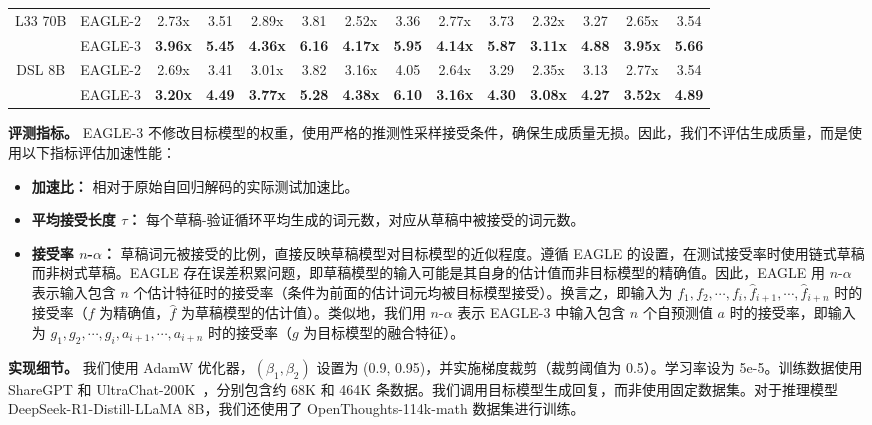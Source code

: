 \documentclass[11pt]{article}
\begin{document}
\begin{table}[h]
{\begin{tabular}{cccccccccccccc}
    \midrule
    \multirow{2}[2]{*}{L33 70B} & EAGLE-2 & 2.73x & 3.51  & 2.89x & 3.81  & 2.52x & 3.36  & 2.77x & 3.73  & 2.32x & 3.27  & 2.65x & 3.54 \\
          & EAGLE-3 & \textbf{3.96x} & \textbf{5.45} & \textbf{4.36x} & \textbf{6.16} & \textbf{4.17x} & \textbf{5.95} & \textbf{4.14x} & \textbf{5.87} & \textbf{3.11x} & \textbf{4.88} & \textbf{3.95x} & \textbf{5.66} \\
    \midrule
    \multirow{2}[2]{*}{DSL 8B} & EAGLE-2 & 2.69x & 3.41  & 3.01x & 3.82  & 3.16x & 4.05  & 2.64x & 3.29  & 2.35x & 3.13  & 2.77x & 3.54 \\
          & EAGLE-3 & \textbf{3.20x} & \textbf{4.49} & \textbf{3.77x} & \textbf{5.28} & \textbf{4.38x} & \textbf{6.10} & \textbf{3.16x} & \textbf{4.30} & \textbf{3.08x} & \textbf{4.27} & \textbf{3.52x} & \textbf{4.89} \\
    \bottomrule
    \end{tabular}%
    }
  \label{tab:experiments}%
\end{table}%

\textbf{评测指标。} EAGLE-3 不修改目标模型的权重，使用严格的推测性采样接受条件，确保生成质量无损。因此，我们不评估生成质量，而是使用以下指标评估加速性能：

\begin{itemize}
    \item \textbf{加速比：} 相对于原始自回归解码的实际测试加速比。
    \item \textbf{平均接受长度 $\tau$：} 每个草稿-验证循环平均生成的词元数，对应从草稿中被接受的词元数。
    \item \textbf{接受率 $n$-$\alpha$：} 草稿词元被接受的比例，直接反映草稿模型对目标模型的近似程度。遵循 EAGLE 的设置，在测试接受率时使用链式草稿而非树式草稿。EAGLE 存在误差积累问题，即草稿模型的输入可能是其自身的估计值而非目标模型的精确值。因此，EAGLE 用 $n$-$\alpha$ 表示输入包含 $n$ 个估计特征时的接受率（条件为前面的估计词元均被目标模型接受）。换言之，即输入为 $f_1,f_2,\cdots,f_i,\hat{f}_{i+1},\cdots,\hat{f}_{i+n}$ 时的接受率（$f$ 为精确值，$\hat{f}$ 为草稿模型的估计值）。类似地，我们用 $n$-$\alpha$ 表示 EAGLE-3 中输入包含 $n$ 个自预测值 $a$ 时的接受率，即输入为 $g_1,g_2,\cdots,g_i,{a}_{i+1},\cdots,{a}_{i+n}$ 时的接受率（$g$ 为目标模型的融合特征）。
\end{itemize}

\textbf{实现细节。} 我们使用 AdamW 优化器，$(\beta_1,\beta_2)$ 设置为 (0.9, 0.95)，并实施梯度裁剪（裁剪阈值为 0.5）。学习率设为 5e-5。训练数据使用 ShareGPT 和 UltraChat-200K~\cite{ding2023enhancing}，分别包含约 68K 和 464K 条数据。我们调用目标模型生成回复，而非使用固定数据集。对于推理模型 DeepSeek-R1-Distill-LLaMA 8B，我们还使用了 OpenThoughts-114k-math 数据集进行训练。
\end{document}
